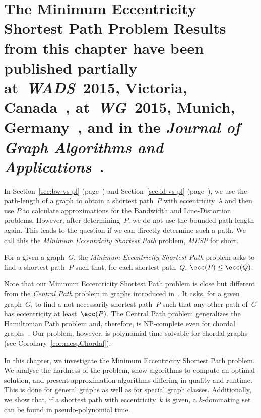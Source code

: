 \chapter
[%
    The Minimum Eccentricity Shortest Path Problem%
]
{%
    The Minimum Eccentricity Shortest Path Problem%
    \chapterNote
    {
        Results from this chapter have been published partially
        at~\emph{WADS}~2015, Victoria, Canada~\cite{DraganLeiter2015},
        at~\emph{WG}~2015, Munich, Germany~\cite{DraganLeiter2015a}, and
        in the \emph{Journal of Graph Algorithms and Applications}~\cite{DraganLeiter2016}.
    }%
}
    \label{cha:mesp}
%

In Section~\ref{sec:bw-vs-pl} (page~\pageref{sec:bw-vs-pl}) and Section~\ref{sec:ld-vs-pl} (page~\pageref{sec:ld-vs-pl}), we use the path-length of a graph to obtain a shortest path~$P$ with eccentricity~$\lambda$ and then use $P$ to calculate approximations for the Bandwidth and Line-Distortion problems.
However, after determining~$P$, we do not use the bounded path-length again.
This leads to the question if we can directly determine such a path.
We call this the \emph{Minimum Eccentricity Shortest Path} problem, \emph{MESP} for short.

\begin{definition}
    \label{def:MESP}
For a given a graph~\( G \), the \emph{Minimum Eccentricity Shortest Path} problem asks to find a shortest path~\( P \) such that, for each shortest path~\( Q \), \( \ecc(P) \leq \ecc(Q) \).
\end{definition}

Note that our Minimum Eccentricity Shortest Path problem is close but different from the \emph{Central Path} problem in graphs introduced in~\cite{Slater1982}.
It asks, for a given graph~$G$, to find a not necessarily shortest path~$P$ such that any other path of~$G$ has eccentricity at least~$\ecc(P)$.
The Central Path problem generalizes the Hamiltonian Path problem and, therefore, is NP-complete even for chordal graphs~\cite{Muller1996}.
Our problem, however, is polynomial time solvable for chordal graphs (see Corollary~\ref{cor:mespChordal}).

In this chapter, we investigate the Minimum Eccentricity Shortest Path problem.
We analyse the hardness of the problem, show algorithms to compute an optimal solution, and present approximation algorithms differing in quality and runtime.
This is done for general graphs as well as for special graph classes.
Additionally, we show that, if a shortest path with eccentricity~$k$ is given, a $k$-dominating set can be found in pseudo-polynomial time.

